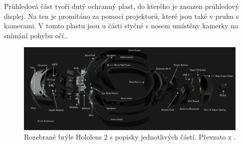 Průhledová část tvoří dutý ochranný plast, do kterého je zasazen průhledový displej. Na ten je promítáno za pomocí projektorů, které jsou také v pruhu s kamerami. V tomto plastu jsou u části styčné s nosem umístěny kamerky na snímání pohybu očí.\cite{hololens2ms}.
\begin{figure}[ht] %
	\centering
	\includegraphics[width=\textwidth]{obrazky-figures/ar/hololensDescription.png}
	\caption{Rozebrané brýle Hololens 2 s popisky jednotlivých částí. Převzato z \cite{hololens2ms}.}
	\label{pic:hololens2}
\end{figure}


